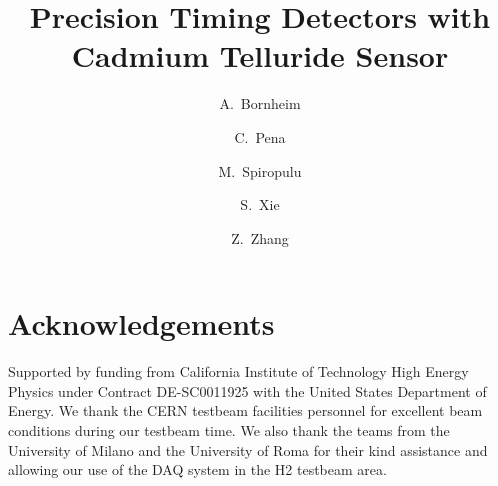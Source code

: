 \documentclass[a4paper,11pt]{article}
\title{Precision Timing Detectors with Cadmium Telluride Sensor}
\author[1]{A.~Bornheim}
\author[1]{C.~Pena}
\author[1]{M.~Spiropulu}
\author[1]{S.~Xie}
\author[1]{Z.~Zhang}
\affiliation[1]{California Institute of Technology, Pasadena, CA, USA}
\begin{document}
  
\maketitle
\flushbottom
\linenumbers


%
%

%
%
  
%
%
  
%
%
  
%
%
  
%
%
  
%
%
  


\section{Acknowledgements} 
Supported by funding from California Institute of Technology High Energy Physics
under Contract DE-SC0011925 with the United States Department of Energy. We
thank the CERN testbeam facilities personnel for excellent beam conditions 
during our testbeam time. We also thank the teams from the University of Milano
and the University of Roma for their kind assistance and allowing our use of the 
DAQ system in the H2 testbeam area.


%
%


{}
 




\end{document}
